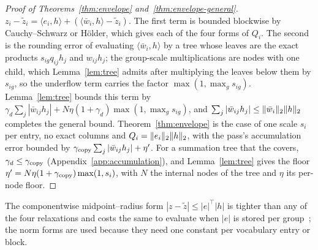 \begin{proof}[Proof of Theorems~\ref{thm:envelope} and~\ref{thm:envelope-general}]
$z_i-\tilde z_i=\langle e_i,h\rangle+(\langle\bar w_i,h\rangle-\tilde z_i)$. The first term is bounded blockwise by Cauchy--Schwarz or Hölder, which gives each of the four forms of $Q_i$. The second is the rounding error of evaluating $\langle\bar w_i,h\rangle$ by a tree whose leaves are the exact products $s_{ig}q_{ij}h_j$ and $w_{ij}h_j$; the group-scale multiplications are nodes with one child, which Lemma~\ref{lem:tree} admits after multiplying the leaves below them by $s_{ig}$, so the underflow term carries the factor $\max(1,\max_gs_{ig})$. Lemma~\ref{lem:tree} bounds this term by $\gamma_d\sum_j|\bar w_{ij}h_j|+N\eta(1+\gamma_d)\max(1,\max_gs_{ig})$, and $\sum_j|\bar w_{ij}h_j|\le\lVert \bar w_i\rVert_2\lVert h\rVert_2$ completes the general bound. Theorem~\ref{thm:envelope} is the case of one scale $s_i$ per entry, no exact columns and $Q_i=\lVert e_i\rVert_2\lVert h\rVert_2$, with the pass's accumulation error bounded by $\gamma_{\rm copy}\sum_j|\bar w_{ij}h_j|+\eta'$. For a summation tree that the \modelcons{} covers, $\gamma_d\le\gamma_{\rm copy}$ (Appendix~\ref{app:accumulation}), and Lemma~\ref{lem:tree} gives the floor $\eta'=N\eta(1+\gamma_{\rm copy})\max(1,s_i)$, with $N$ the internal nodes of the tree and $\eta$ its per-node floor.
\end{proof}
The componentwise midpoint--radius form $|z-\tilde z|\le|e|^\top|h|$ is tighter than any of the four relaxations and costs the same to evaluate when $|e|$ is stored per group~\cite{rump2010}; the norm forms are used because they need one constant per vocabulary entry or block.

